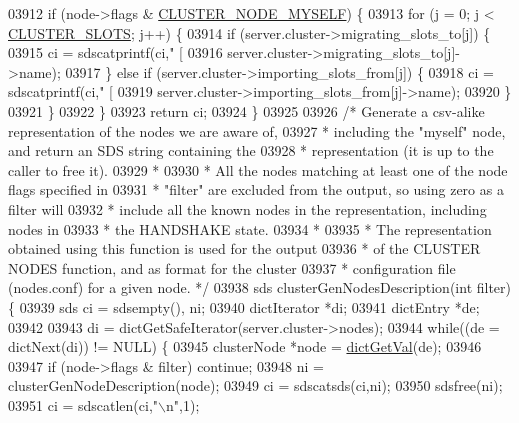 \begin{DoxyCode}
{{{{{{{{{{{{{{{{{{{{{{{{{{{{{{{{{{{{{{{{{{{{{{{{{{{{{{{{{{{{{{{{{{{{{03912     \textcolor{keywordflow}{if} (node->flags & \hyperlink{cluster_8h_afee946c4e74c08465e9b4ead5e3659e6}{CLUSTER\_NODE\_MYSELF}) \{
03913         \textcolor{keywordflow}{for} (j = 0; j < \hyperlink{cluster_8h_aa3e2cb951eebb16725ecc3f5beefd9fd}{CLUSTER\_SLOTS}; j++) \{
03914             \textcolor{keywordflow}{if} (server.cluster->migrating\_slots\_to[j]) \{
03915                 ci = sdscatprintf(ci,\textcolor{stringliteral}{" [%
03916                     server.cluster->migrating\_slots\_to[j]->name);
03917             \} \textcolor{keywordflow}{else} \textcolor{keywordflow}{if} (server.cluster->importing\_slots\_from[j]) \{
03918                 ci = sdscatprintf(ci,\textcolor{stringliteral}{" [%
03919                     server.cluster->importing\_slots\_from[j]->name);
03920             \}
03921         \}
03922     \}
03923     \textcolor{keywordflow}{return} ci;
03924 \}
03925 
03926 \textcolor{comment}{/* Generate a csv-alike representation of the nodes we are aware of,}
03927 \textcolor{comment}{ * including the "myself" node, and return an SDS string containing the}
03928 \textcolor{comment}{ * representation (it is up to the caller to free it).}
03929 \textcolor{comment}{ *}
03930 \textcolor{comment}{ * All the nodes matching at least one of the node flags specified in}
03931 \textcolor{comment}{ * "filter" are excluded from the output, so using zero as a filter will}
03932 \textcolor{comment}{ * include all the known nodes in the representation, including nodes in}
03933 \textcolor{comment}{ * the HANDSHAKE state.}
03934 \textcolor{comment}{ *}
03935 \textcolor{comment}{ * The representation obtained using this function is used for the output}
03936 \textcolor{comment}{ * of the CLUSTER NODES function, and as format for the cluster}
03937 \textcolor{comment}{ * configuration file (nodes.conf) for a given node. */}
03938 sds clusterGenNodesDescription(\textcolor{keywordtype}{int} filter) \{
03939     sds ci = sdsempty(), ni;
03940     dictIterator *di;
03941     dictEntry *de;
03942 
03943     di = dictGetSafeIterator(server.cluster->nodes);
03944     \textcolor{keywordflow}{while}((de = dictNext(di)) != NULL) \{
03945         clusterNode *node = \hyperlink{dict_8h_ae8d2cc391873b2bea2b87c4f80f43120}{dictGetVal}(de);
03946 
03947         \textcolor{keywordflow}{if} (node->flags & filter) \textcolor{keywordflow}{continue};
03948         ni = clusterGenNodeDescription(node);
03949         ci = sdscatsds(ci,ni);
03950         sdsfree(ni);
03951         ci = sdscatlen(ci,\textcolor{stringliteral}{"\(\backslash\)n"},1);
}}}}}}}}}}}}}}}}}}}}}}}}}}}}}}}}}}}}}}}}}}}}}}}}}}}}}}}}}}}}}}}}}}}}}}}
\end{DoxyCode}
